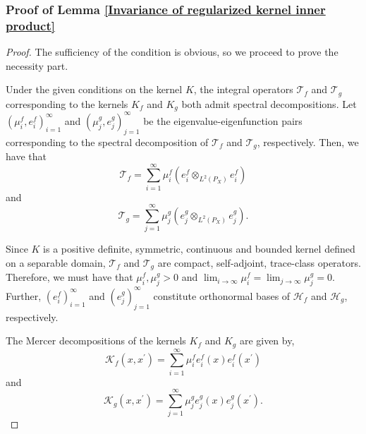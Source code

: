 \documentclass{article}
\theoremstyle{plain}
\newcommand{\Hf}{\mathcal{H}_{f}}
\newcommand{\Hg}{\mathcal{H}_{g}}
\newcommand{\LPtwo}{L^{2}(P_{X})}
\begin{document}
\subsubsection{Proof of Lemma \ref{Invariance of regularized kernel inner product}}\label{Proof Lemma 2}

\begin{proof}
    The sufficiency of the condition is obvious, so we proceed to prove the necessity part.

    Under the given conditions on the kernel $K$, the integral operators $\mathcal{T}_{f}$ and $\mathcal{T}_{g}$ corresponding to the kernels $K_{f}$ and $K_{g}$ both admit spectral decompositions. Let $\left(\mu_{i}^{f},e_{i}^{f}\right)_{i=1}^{\infty}$ and $\left(\mu_{j}^{g},e_{j}^{g}\right)_{j=1}^{\infty}$ be the eigenvalue-eigenfunction pairs corresponding to the spectral decomposition of $\mathcal{T}_{f}$ and $\mathcal{T}_{g}$, respectively. Then, we have that
    \begin{equation*}\label{Spectral decomposition of Tf}
        \mathcal{T}_{f} = \sum_{i=1}^{\infty} \mu_{i}^{f} \left(e_{i}^{f} \otimes_{\LPtwo} e_{i}^{f}\right)
    \end{equation*}
    and
    \begin{equation*}\label{Spectral decomposition of Tg}
        \mathcal{T}_{g} = \sum_{j=1}^{\infty} \mu_{j}^{g} \left(e_{j}^{g} \otimes_{\LPtwo} e_{j}^{g}\right).
    \end{equation*}

    Since $K$ is a positive definite, symmetric, continuous and bounded kernel defined on a separable domain, $\mathcal{T}_{f}$ and $\mathcal{T}_{g}$ are compact, self-adjoint, trace-class operators. Therefore, we must have that $\mu_{i}^{f},\mu_{j}^{g} > 0$ and $\lim_{i \to \infty} \mu_{i}^{f} = \lim_{j \to \infty} \mu_{j}^{g} = 0$. Further, $(e_{i}^{f})_{i=1}^{\infty}$ and $(e_{j}^{g})_{j=1}^{\infty}$ constitute orthonormal bases of $\Hf$ and $\Hg$, respectively.

    The Mercer decompositions of the kernels $K_{f}$ and $K_{g}$ are given by,
    \begin{equation*}\label{Mercer decomposition of Kf}
        \mathcal{K}_{f}(x,x^{\prime}) = \sum_{i=1}^{\infty} \mu_{i}^{f} e_{i}^{f}(x) e_{i}^{f}(x^{\prime})
    \end{equation*}
    and 
    \begin{equation*}\label{Mercer decomposition of Kg}
        \mathcal{K}_{g}(x,x^{\prime}) = \sum_{j=1}^{\infty} \mu_{j}^{g} e_{j}^{g}(x) e_{j}^{g}(x^{\prime}).
    \end{equation*}


\end{proof}
\end{document}
